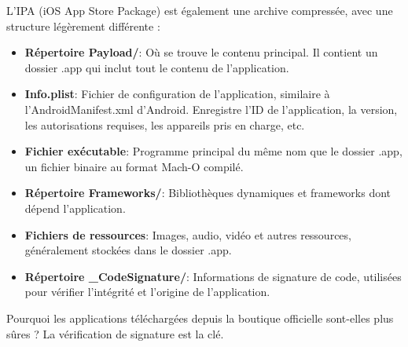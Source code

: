 
L'IPA (iOS App Store Package) est également une archive compressée, avec une structure légèrement différente :

\begin{itemize}
  \item \textbf{Répertoire Payload/}: Où se trouve le contenu principal. Il contient un dossier .app qui inclut tout le contenu de l'application.
  \item \textbf{Info.plist}: Fichier de configuration de l'application, similaire à l'AndroidManifest.xml d'Android. Enregistre l'ID de l'application, la version, les autorisations requises, les appareils pris en charge, etc.
  \item \textbf{Fichier exécutable}: Programme principal du même nom que le dossier .app, un fichier binaire au format Mach-O compilé.
  \item \textbf{Répertoire Frameworks/}: Bibliothèques dynamiques et frameworks dont dépend l'application.
  \item \textbf{Fichiers de ressources}: Images, audio, vidéo et autres ressources, généralement stockées dans le dossier .app.
  \item \textbf{Répertoire \_CodeSignature/}: Informations de signature de code, utilisées pour vérifier l'intégrité et l'origine de l'application.
\end{itemize}


Pourquoi les applications téléchargées depuis la boutique officielle sont-elles plus sûres ? La vérification de signature est la clé.

